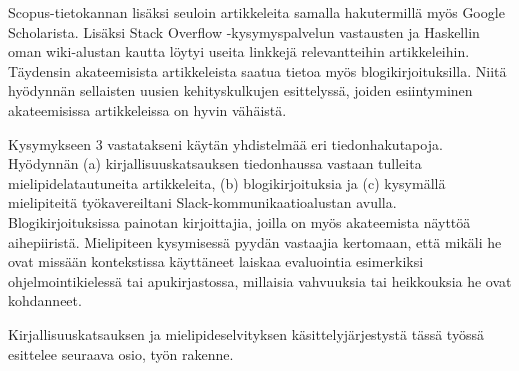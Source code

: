 Scopus-tietokannan lisäksi seuloin artikkeleita samalla hakutermillä myös Google Scholarista. Lisäksi Stack Overflow -kysymyspalvelun vastausten ja Haskellin oman wiki-alustan kautta löytyi useita linkkejä relevantteihin artikkeleihin. Täydensin akateemisista artikkeleista saatua tietoa myös blogikirjoituksilla. Niitä hyödynnän sellaisten uusien kehityskulkujen esittelyssä, joiden esiintyminen akateemisissa artikkeleissa on hyvin vähäistä.

\begin{sloppypar}
Kysymykseen 3 vastatakseni käytän yhdistelmää eri tiedonhakutapoja. Hyödynnän (a) kirjallisuuskatsauksen tiedonhaussa vastaan tulleita mielipidelatautuneita artikkeleita, (b) blogikirjoituksia ja (c) kysymällä mielipiteitä työkavereiltani Slack-kommunikaatioalustan avulla. Blogikirjoituksissa painotan kirjoittajia, joilla on myös akateemista näyttöä aihepiiristä. Mielipiteen kysymisessä pyydän vastaajia kertomaan, että mikäli he ovat missään kontekstissa käyttäneet laiskaa evaluointia esimerkiksi ohjelmointikielessä tai apukirjastossa, millaisia vahvuuksia tai heikkouksia he ovat kohdanneet.
\end{sloppypar}

Kirjallisuuskatsauksen ja mielipideselvityksen käsittelyjärjestystä tässä työssä esittelee seuraava osio, työn rakenne.
